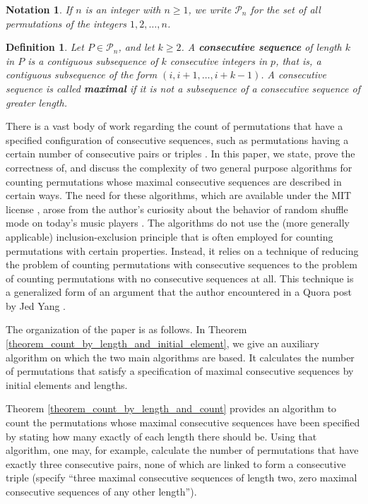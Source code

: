 \documentclass{article}
\newtheorem{definition}[theorem]{Definition}
\newtheorem{notation}[theorem]{Notation}
\begin{document}
\begin{notation}
  If $n$ is an integer with $n \geq 1$, we write ${\mathcal P}_n$ for the set of all permutations of the integers
  $1, 2, \ldots, n$.
\end{notation}

\begin{definition}
  Let $P\in {\mathcal P}_n$, and let $k \geq 2$.
  A {\bf consecutive sequence} of length $k$ in $P$ is a contiguous subsequence of $k$ consecutive
  integers in $p$, that is, a contiguous subsequence of the form $(i, i+1, \ldots, i+k-1)$.
  A consecutive sequence is called {\bf maximal} if it is not a subsequence of a consecutive sequence
  of greater length.
\end{definition}

There is a vast body of work regarding the count of permutations that have a specified configuration of
consecutive sequences, such as permutations having a certain number of consecutive pairs or triples
\cite{OeisRefs}. In this paper, we state, prove the correctness of, and discuss the complexity of two general
purpose algorithms for
counting permutations whose maximal consecutive sequences are described in certain ways. The need
for these algorithms, which are available under the MIT license \cite{Algos}, arose from the author's curiosity
about the behavior of random shuffle mode on today's music players \cite{BlogPost}. The algorithms do not
use the (more generally applicable) inclusion-exclusion principle that is often employed for counting
permutations with certain properties. Instead, it relies on a technique of reducing the problem of counting
permutations with consecutive sequences to the problem of counting permutations with no consecutive sequences
at all. This technique is a generalized form of an argument that the author encountered in a Quora post by Jed Yang
\cite{JedYang}.

The organization of the paper is as follows. In Theorem \ref{theorem_count_by_length_and_initial_element},
we give an auxiliary algorithm on which the
two main algorithms are based. It calculates the number of permutations that satisfy a specification of
maximal consecutive sequences by initial elements and lengths.

Theorem \ref{theorem_count_by_length_and_count}
provides an algorithm to count the permutations whose maximal consecutive sequences have been specified by
stating how many exactly of each length there should be. Using that algorithm, one may, for example,
calculate the number of permutations that have exactly three consecutive pairs, none of which are linked
to form a consecutive triple (specify ``three maximal consecutive sequences of length two, zero maximal
consecutive sequences of any other length'').
\end{document}
